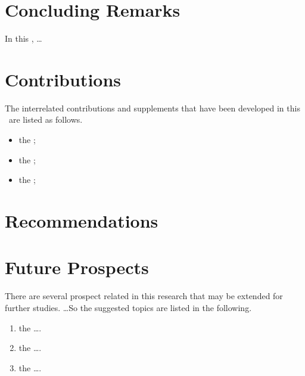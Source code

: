\section{Concluding Remarks}

In this \documentType, \ldots

\section{Contributions}

The interrelated  contributions and supplements that have been developed in this \documentType \ are listed as follows.

\begin{itemize}
  \item the ; 
	
	\item the ; 
  
  \item the ; 
	
\end{itemize}


\section{Recommendations}

\textcolor[rgb]{0.75,0.75,0.75}{\Blindtext}

\section{Future Prospects}

There are several prospect related in this research that may be extended for further studies. \ldots So the suggested topics are listed in the following.

\begin{enumerate}
	\item  the \ldots.
	
	\item  the \ldots.
		
	\item  the \ldots.
\end{enumerate}



